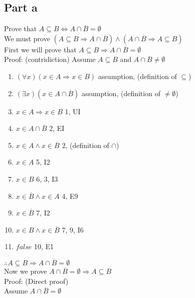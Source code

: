 \documentclass{article}
\begin{document}
		\subsection{Part a}
			Prove that $A \subseteq B \Leftrightarrow A \cap \overline{B} = \emptyset$ \\
			We must prove $(A \subseteq B \Rightarrow A \cap \overline{B}) \land (A \cap \overline{B} \Rightarrow A \subseteq B)$ \\
			First we will prove that $A \subseteq B \Rightarrow A \cap \overline{B} = \emptyset$ \\
			Proof: (contridiction)
			Assume $A \subseteq B$ and $A \cap \overline{B} \neq \emptyset$
			\begin{enumerate}
				\item $(\forall x)(x \in A \Rightarrow x \in B)$ \hfill assumption, (definition of $\subseteq$)
				\item $(\exists x)(x \in A \cap \overline{B})$ \hfill assumption, (definition of $\neq \emptyset$)
				\item $x \in A \Rightarrow x \in B$ \hfill 1, UI
				\item $x \in A \cap \overline{B}$ \hfill 2, EI
				\item $x \in A \land x \in \overline{B}$ \hfill 2, (definition of $\cap$)
				\item $x \in A$ \hfill 5, I2
				\item $x \in B$ \hfill 6, 3, I3
				\item $x \in \overline{B} \land x \in A$ \hfill 4, E9
				\item $x \in \overline{B}$ \hfill 7, I2
				\item $x \in B \land x \in \overline{B}$ \hfill 7, 9, I6
				\item $false$ \hfill 10, E1
			\end{enumerate}
			$\therefore A \subseteq B \Rightarrow A \cap \overline{B} = \emptyset$ \\
			Now we prove $A \cap \overline{B} = \emptyset \Rightarrow A \subseteq B$ \\
			Proof: (Direct proof) \\
			Assume $A \cap \overline{B} = \emptyset$
\end{document}
